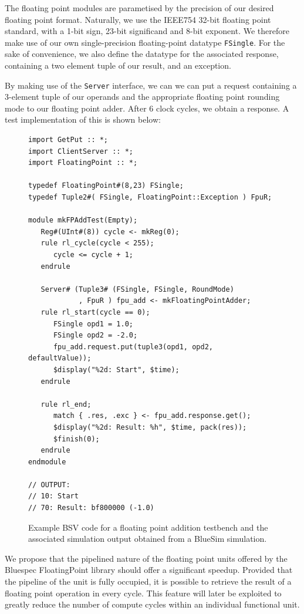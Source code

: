 \documentclass[a4paper,8pt]{report}
\begin{document}
The floating point modules are parametised by the precision of our desired floating
point format. Naturally, we use the IEEE754 32-bit floating point standard, with a 1-bit sign,
23-bit significand and 8-bit exponent. We therefore make use of our own
single-precision floating-point datatype \texttt{FSingle}. For the sake of
convenience, we also define the datatype for the associated response, containing
a two element tuple of our result, and an exception.

By making use of the \texttt{Server} interface, we can we can put a request containing a
3-element tuple of our operands and the appropriate floating point rounding mode
to our floating point adder. After 6 clock cycles, we obtain a response. A test
implementation of this is shown below: \\

\begin{figure}[h]
  \centering 
\tiny
\begin{verbatim}
import GetPut :: *;
import ClientServer :: *;
import FloatingPoint :: *;

typedef FloatingPoint#(8,23) FSingle;
typedef Tuple2#( FSingle, FloatingPoint::Exception ) FpuR;

module mkFPAddTest(Empty);
   Reg#(UInt#(8)) cycle <- mkReg(0);
   rule rl_cycle(cycle < 255);
      cycle <= cycle + 1;
   endrule

   Server# (Tuple3# (FSingle, FSingle, RoundMode)
            , FpuR ) fpu_add <- mkFloatingPointAdder;
   rule rl_start(cycle == 0);
      FSingle opd1 = 1.0;
      FSingle opd2 = -2.0;
      fpu_add.request.put(tuple3(opd1, opd2, defaultValue));
      $display("%2d: Start", $time);
   endrule

   rule rl_end;
      match { .res, .exc } <- fpu_add.response.get();
      $display("%2d: Result: %h", $time, pack(res)); 
      $finish(0);
   endrule
endmodule

// OUTPUT:
// 10: Start
// 70: Result: bf800000 (-1.0)
\end{verbatim}
\normalsize
\caption{Example BSV code for a floating point addition testbench and the
  associated simulation output obtained from a BlueSim simulation.}
\end{figure}

We propose that the pipelined nature of the floating point units offered by the
Bluespec FloatingPoint library should offer a significant speedup. Provided that
the pipeline of the unit is fully occupied, it is possible to retrieve the result
of a floating point operation in every cycle. This feature will later be
exploited to greatly reduce the number of compute cycles within an individual
functional unit.
\end{document}
